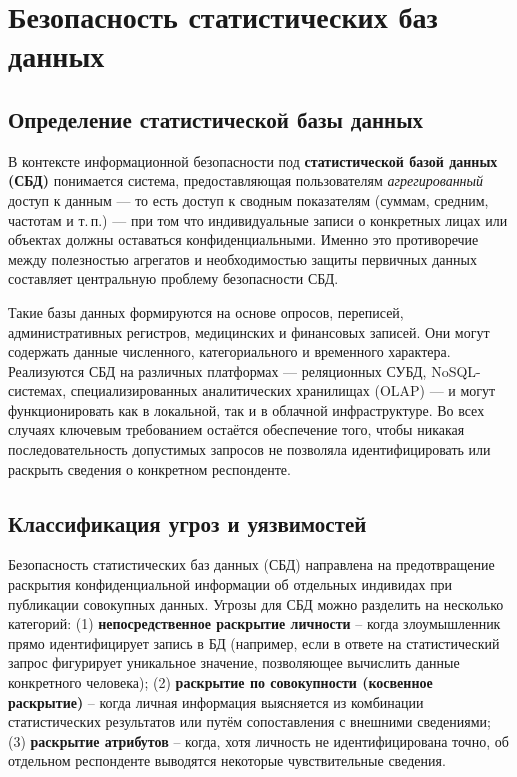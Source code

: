 \section{Безопасность статистических баз данных}
\subsection{Определение статистической базы данных}
В контексте информационной безопасности под \textbf{статистической базой данных (СБД)} понимается система, предоставляющая
пользователям \textit{агрегированный} доступ к данным — то есть доступ к сводным показателям (суммам, средним,
частотам и т.\,п.) — при том что индивидуальные записи о конкретных лицах или объектах должны оставаться
конфиденциальными. Именно это противоречие между полезностью агрегатов и необходимостью защиты первичных данных
составляет центральную проблему безопасности СБД.

Такие базы данных формируются на основе опросов, переписей, административных регистров, медицинских и финансовых
записей. Они могут содержать данные численного, категориального и временного характера. Реализуются СБД на различных
платформах — реляционных СУБД, NoSQL-системах, специализированных аналитических хранилищах (OLAP) — и могут
функционировать как в локальной, так и в облачной инфраструктуре. Во всех случаях ключевым требованием остаётся
обеспечение того, чтобы никакая последовательность допустимых запросов не позволяла идентифицировать или раскрыть
сведения о конкретном респонденте.

\subsection{Классификация угроз и уязвимостей}
Безопасность статистических баз данных (СБД) направлена на предотвращение раскрытия
конфиденциальной информации об отдельных индивидах при публикации совокупных данных.
Угрозы для СБД можно разделить на несколько категорий: (1) \textbf{непосредственное
раскрытие личности} – когда злоумышленник прямо идентифицирует запись в БД (например, если
в ответе на статистический запрос фигурирует уникальное значение, позволяющее вычислить
данные конкретного человека); (2) \textbf{раскрытие по совокупности (косвенное раскрытие)}
– когда личная информация выясняется из комбинации статистических результатов или путём
сопоставления с внешними сведениями; (3) \textbf{раскрытие атрибутов} – когда, хотя
личность не идентифицирована точно, об отдельном респонденте выводятся некоторые
чувствительные сведения.

